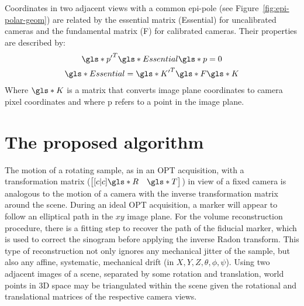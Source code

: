 \documentclass[times, twoside, watermark]{zHenriquesLab-StyleBioRxiv}
\begin{document}
Coordinates in two adjacent views with a common epi-pole (see Figure~\ref{fig:epi-polar-geom}) are related by the essential matrix (\gls*{Essential}) for uncalibrated cameras and the fundamental matrix (\gls*{F}) for calibrated cameras.
Their properties are described by:
\begin{gather}
\gls*{p'}^T \gls*{Essential} \gls*{p} = 0 \label{eq:pEp}\\
\gls*{Essential} = \gls*{K'}^T \gls*{F} \gls*{K} %
\end{gather}
Where \(\gls*{K}\) is a matrix that converts image plane coordinates to camera pixel coordinates and where \gls*{p} refers to a point in the image plane.

\section*{The proposed algorithm}

The motion of a rotating sample, as in an \gls*{OPT} acquisition, with a transformation matrix (\( \begin{bmatrix}[c|c] \gls*{R} & \gls*{T} \end{bmatrix}\)) in view of a fixed camera is analogous to the motion of a camera with the inverse transformation matrix around the scene. %
During an ideal \gls*{OPT} acquisition, a marker will appear to follow an elliptical path in the \(xy\) image plane. For the volume reconstruction procedure, there is a fitting step to recover the path of the fiducial marker, which is used to correct the sinogram before applying the inverse \gls*{Radon transform}. This type of reconstruction not only ignores any mechanical jitter of the sample, but also any affine, systematic, mechanical drift (in \(X,Y,Z,\theta,\phi,\psi \)). %
Using two adjacent images of a scene, separated by some rotation and translation, world points in 3D space may be triangulated within the scene given the rotational and translational matrices of the respective camera views.
\end{document}

